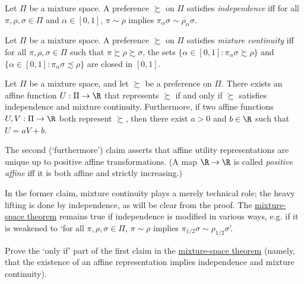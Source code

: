 \begin{definition}
	\label{definition:mix_indep}
	Let $\Pi$ be a mixture space. A preference $\succsim$ on $\Pi$ satisfies \emph{independence} iff for all $\pi,\rho,\sigma \in \Pi$ and $\alpha \in [0,1]$, $\pi \sim \rho$ implies $\pi_\alpha \sigma \sim \rho_\alpha \sigma$.
\end{definition}

\begin{definition}
	\label{definition:mix_continuity}
	Let $\Pi$ be a mixture space. A preference $\succsim$ on $\Pi$ satisfies \emph{mixture continuity} iff for all $\pi,\rho,\sigma \in \Pi$ such that $\pi \succsim \rho \succsim \sigma$, the sets $\{ \alpha \in [0,1] : \pi_\alpha \sigma \succsim \rho \}$ and $\{ \alpha \in [0,1] : \pi_\alpha \sigma \precsim \rho \}$ are closed in $[0,1]$.
\end{definition}

\begin{namedthm}
	\label{theorem:mix}
	Let $\Pi$ be a mixture space, and let $\succsim$ be a preference on $\Pi$. There exists an affine function $U : \Pi \to \R$ that represents $\succsim$ if and only if $\succsim$ satisfies independence and mixture continuity. Furthermore, if two affine functions $U,V : \Pi \to \R$ both represent $\succsim$, then there exist $a>0$ and $b \in \R$ such that $U = a V + b$.
\end{namedthm}

The second (`furthermore') claim asserts that affine utility representations are unique up to positive affine transformations. (A map $\R \to \R$ is called \emph{positive affine} iff it is both affine and strictly increasing.)

In the former claim, mixture continuity plays a merely technical role; the heavy lifting is done by independence, as will be clear from the proof. The \hyperref[theorem:mix]{mixture-space theorem} remains true if independence is modified in various ways, e.g. if it is weakened to `for all $\pi,\rho,\sigma \in \Pi$, $\pi \sim \rho$ implies $\pi_{1/2} \sigma \sim \rho_{1/2} \sigma$'.

\begin{exercise}
	\label{exercise:mix_easy}
	Prove the `only if' part of the first claim in the \hyperref[theorem:mix]{mixture-space theorem} (namely, that the existence of an affine representation implies independence and mixture continuity).
\end{exercise}

